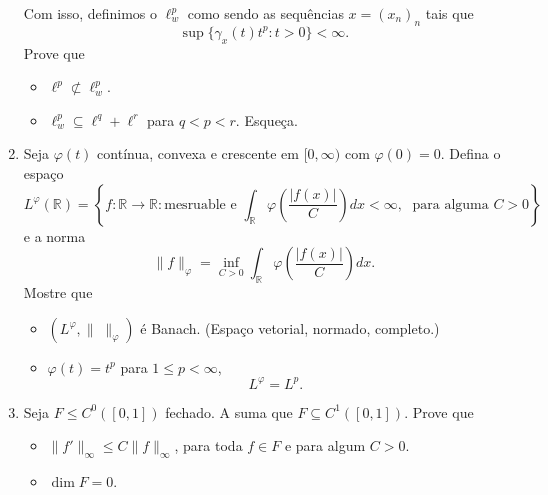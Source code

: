 \documentclass[portuguese]{article}
\theoremstyle{definition}
\newcommand{\R}{\mathbb{R}}
\begin{document}
\begin{enumerate}
\begin{itemize}
	\end{itemize}
	Com isso, definimos o $\ell_w^p$ como sendo as sequências $x=(x_n)_n$ tais que
	\[\sup\{\gamma_x(t)t^p:t>0\}<\infty.\]
	Prove que
	\begin{itemize}
		\item $\ell^p\not\subset\ell^p_w$.
		\item $\ell^p_w\subseteq\ell^q+\ell^r$ para $q<p<r$. {\color{orange}Esqueça.}
	\end{itemize}
	\item Seja $\varphi(t)$ contínua, convexa e crescente em $[0,\infty)$ com $\varphi(0)=0$. Defina o espaço
	\[L^\varphi(\R)=\left\{f:\R\to\R:\text{mesruable e }\int_\R\varphi\left(\frac{|f(x)|}{C}\right)dx<\infty,\;\text{ para alguma } C>0\right\}\]
	e a norma
	\[\|f\|_\varphi=\inf_{C>0}\int_\R\varphi\left(\frac{|f(x)|}{C}\right)dx.\]
	Mostre que
	\begin{itemize}
		\item $(L^\varphi,\|\;\|_\varphi)$ é Banach. (Espaço vetorial, normado, completo.)
		\item $\varphi(t)=t^p$ para $1\leq p<\infty$,
		\[L^\varphi=L^p.\]
	\end{itemize}
	\item Seja $F\leq C^0([0,1])$ fechado. A suma que $F\subseteq C^1([0,1])$. Prove que
	\begin{itemize}
		\item $\|f'\|_\infty\leq C\|f\|_\infty$, para toda $f\in F$ e para algum $C>0$.
		\item $\dim F=0$.
	\end{itemize}
\end{enumerate}
\end{document}
